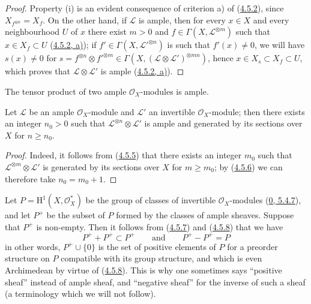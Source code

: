 \begin{proof}
Property (i) is an evident consequence of criterion a) of
(\hyperref[II.4.5.2]{4.5.2}), since $X_{f^{\otimes n}}=X_f$. On the other
hand, if $\mathcal{L}$ is ample, then for every $x\in X$ and every neighbourhood $U$ of
$x$ there exist $m>0$ and $f\in\Gamma(X,\mathcal{L}^{\otimes m})$ such that
$x\in X_f\subset U$ (\hyperref[II.4.5.2]{4.5.2, a)}); if
$f'\in\Gamma(X,\mathcal{L}'^{\otimes n})$ is such that $f'(x)\neq0$, we will have
$s(x)\neq0$ for
$s=f^{\otimes n}\otimes f'^{\otimes m}\in
\Gamma(X,(\mathcal{L}\otimes\mathcal{L}')^{\otimes mn})$, hence
$x\in X_s\subset X_f\subset U$, which proves that
$\mathcal{L}\otimes\mathcal{L}'$ is ample
(\hyperref[II.4.5.2]{4.5.2, a)}).
\end{proof}

\begin{corollary}[4.5.7]
\label{II.4.5.7}
The tensor product of two ample $\mathcal{O}_X$-modules is ample.
\end{corollary}

\begin{corollary}[4.5.8]
\label{II.4.5.8}
Let $\mathcal{L}$ be an ample $\mathcal{O}_X$-module and $\mathcal{L}'$ an
invertible $\mathcal{O}_X$-module; then there exists an integer $n_0>0$ such
that $\mathcal{L}^{\otimes n}\otimes\mathcal{L}'$ is ample and generated by
its sections over $X$ for $n\geq n_0$.
\end{corollary}

\begin{proof}
Indeed, it follows from (\hyperref[II.4.5.5]{4.5.5}) that there exists an integer
$m_0$ such that $\mathcal{L}^{\otimes m}\otimes\mathcal{L}'$ is generated by
its sections over $X$ for $m\geq m_0$; by
(\hyperref[II.4.5.6]{4.5.6}) we can therefore take $n_0=m_0+1$.
\end{proof}

\begin{remark}[4.5.9]
\label{II.4.5.9}
Let $P=\mathrm{H}^1(X,\mathcal{O}_X^*)$ be the group of classes of
invertible $\mathcal{O}_X$-modules (\hyperref[0.5.4.7]{0, 5.4.7}), and
let $P^+$ be the subset of $P$ formed by the classes of ample sheaves. Suppose
that $P^+$ is non-empty. Then it follows from
(\hyperref[II.4.5.7]{4.5.7}) and
(\hyperref[II.4.5.8]{4.5.8}) that we have
\[
  P^++P^+\subset P^+
  \qquad\text{and}\qquad
  P^+-P^+=P
\]
in other words, $P^+\cup\{0\}$ is the set of positive elements of $P$
for a preorder structure on $P$ compatible with its group
structure, and which is even Archimedean by virtue of
(\hyperref[II.4.5.8]{4.5.8}). This is why one sometimes says ``positive
sheaf'' instead of ample sheaf, and ``negative sheaf'' for the inverse
of such a sheaf (a terminology which we will not follow).
\end{remark}

